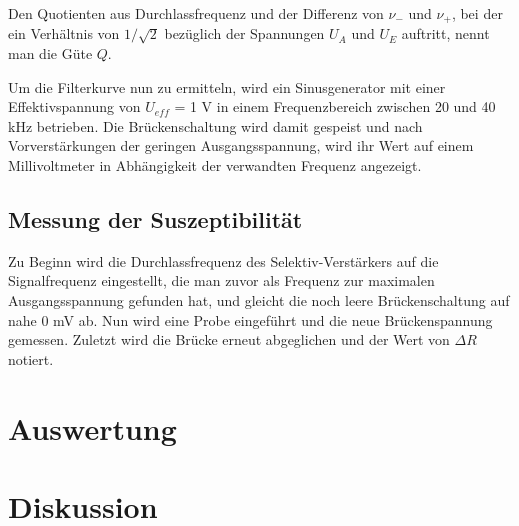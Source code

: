 Den Quotienten aus Durchlassfrequenz und der Differenz von $\nu_-$ und $\nu_+$, bei der ein Verhältnis von $1/\sqrt{2}$ bezüglich der 
Spannungen $U_A$ und $U_E$ auftritt, nennt man die Güte $Q$.

Um die Filterkurve nun zu ermitteln, wird ein Sinusgenerator mit einer Effektivspannung von $U_{eff}$ = 1 V in einem Frequenzbereich 
zwischen 20 und 40 kHz betrieben. Die Brückenschaltung wird damit gespeist und nach Vorverstärkungen der geringen Ausgangsspannung,
wird ihr Wert auf einem Millivoltmeter in Abhängigkeit der verwandten Frequenz angezeigt.

\subsection{Messung der Suszeptibilität}
Zu Beginn wird die Durchlassfrequenz des Selektiv-Verstärkers auf die Signalfrequenz eingestellt, die man zuvor als Frequenz zur maximalen
Ausgangsspannung gefunden hat, und gleicht die noch leere Brückenschaltung auf nahe 0 mV ab. Nun wird eine Probe eingeführt und die
neue Brückenspannung gemessen. Zuletzt wird die Brücke erneut abgeglichen und der Wert von $\Delta R$ notiert. 

\section{Auswertung}

\section{Diskussion}





